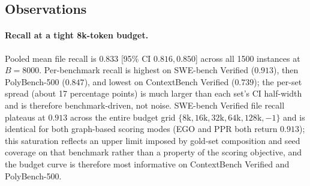 \documentclass[11pt, a4paper]{article}
\begin{document}
\begin{table}[h]
\centering
\small
\caption{Per-language metrics with 95\% percentile bootstrap CIs ($B{=}10{,}000$). Pooled across the three test sets, status=ok only.}
\label{tab:prelim-lang}
\end{table}

\subsection{Observations}

\paragraph{Recall at a tight 8k-token budget.} Pooled mean file recall is $0.833$ [95\% CI $0.816, 0.850$] across all 1500 instances at $B{=}8000$. Per-benchmark recall is highest on SWE-bench Verified ($0.913$), then PolyBench-500 ($0.847$), and lowest on ContextBench Verified ($0.739$); the per-set spread (about 17 percentage points) is much larger than each set's CI half-width and is therefore benchmark-driven, not noise. SWE-bench Verified file recall plateaus at $0.913$ across the entire budget grid $\{8\mathrm{k}, 16\mathrm{k}, 32\mathrm{k}, 64\mathrm{k}, 128\mathrm{k}, -1\}$ and is identical for both graph-based scoring modes (EGO and PPR both return $0.913$); this saturation reflects an upper limit imposed by gold-set composition and seed coverage on that benchmark rather than a property of the scoring objective, and the budget curve is therefore most informative on ContextBench Verified and PolyBench-500.
\end{document}
